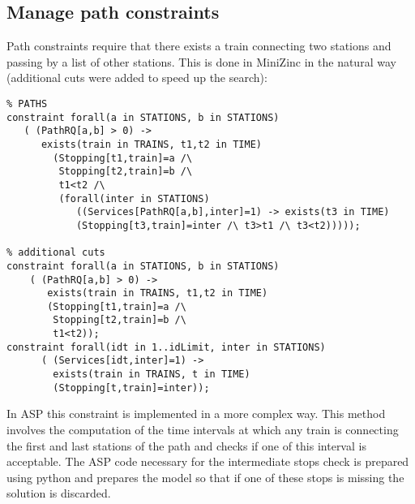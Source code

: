 \documentclass[11pt]{article}
\begin{document}
\subsection{Manage path constraints}
Path constraints require that there exists a train connecting two stations
and passing by a list of other stations. 
This is done in MiniZinc in the natural way (additional cuts were added to 
speed up the search):
\begin{verbatim}
% PATHS
constraint forall(a in STATIONS, b in STATIONS)
   ( (PathRQ[a,b] > 0) -> 
      exists(train in TRAINS, t1,t2 in TIME) 
        (Stopping[t1,train]=a /\ 
         Stopping[t2,train]=b /\ 
         t1<t2 /\
         (forall(inter in STATIONS)
            ((Services[PathRQ[a,b],inter]=1) -> exists(t3 in TIME) 
            (Stopping[t3,train]=inter /\ t3>t1 /\ t3<t2)))));
            
% additional cuts
constraint forall(a in STATIONS, b in STATIONS)
    ( (PathRQ[a,b] > 0) -> 
       exists(train in TRAINS, t1,t2 in TIME) 
       (Stopping[t1,train]=a /\ 
        Stopping[t2,train]=b /\
        t1<t2));
constraint forall(idt in 1..idLimit, inter in STATIONS)
      ( (Services[idt,inter]=1) -> 
        exists(train in TRAINS, t in TIME)
        (Stopping[t,train]=inter));
\end{verbatim}
In ASP this constraint is implemented in a more complex way. This method 
involves the computation of the time intervals at which any train is connecting
the first and last stations of the path and checks if one of this interval is acceptable.
The ASP code necessary for the intermediate stops check is prepared using python and
prepares the model 
so that if one of these stops is missing the solution is discarded.
\end{document}
